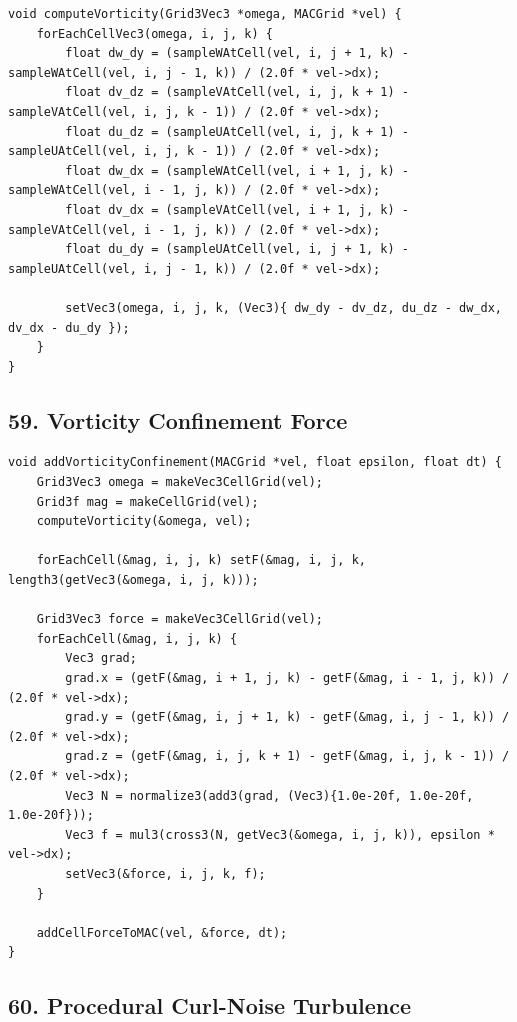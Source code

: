 \documentclass[10pt,letterpaper]{article}
\begin{document}
\begin{verbatim}
void computeVorticity(Grid3Vec3 *omega, MACGrid *vel) {
    forEachCellVec3(omega, i, j, k) {
        float dw_dy = (sampleWAtCell(vel, i, j + 1, k) - sampleWAtCell(vel, i, j - 1, k)) / (2.0f * vel->dx);
        float dv_dz = (sampleVAtCell(vel, i, j, k + 1) - sampleVAtCell(vel, i, j, k - 1)) / (2.0f * vel->dx);
        float du_dz = (sampleUAtCell(vel, i, j, k + 1) - sampleUAtCell(vel, i, j, k - 1)) / (2.0f * vel->dx);
        float dw_dx = (sampleWAtCell(vel, i + 1, j, k) - sampleWAtCell(vel, i - 1, j, k)) / (2.0f * vel->dx);
        float dv_dx = (sampleVAtCell(vel, i + 1, j, k) - sampleVAtCell(vel, i - 1, j, k)) / (2.0f * vel->dx);
        float du_dy = (sampleUAtCell(vel, i, j + 1, k) - sampleUAtCell(vel, i, j - 1, k)) / (2.0f * vel->dx);

        setVec3(omega, i, j, k, (Vec3){ dw_dy - dv_dz, du_dz - dw_dx, dv_dx - du_dy });
    }
}
\end{verbatim}

\subsection*{59. Vorticity Confinement Force}

\begin{verbatim}
void addVorticityConfinement(MACGrid *vel, float epsilon, float dt) {
    Grid3Vec3 omega = makeVec3CellGrid(vel);
    Grid3f mag = makeCellGrid(vel);
    computeVorticity(&omega, vel);

    forEachCell(&mag, i, j, k) setF(&mag, i, j, k, length3(getVec3(&omega, i, j, k)));

    Grid3Vec3 force = makeVec3CellGrid(vel);
    forEachCell(&mag, i, j, k) {
        Vec3 grad;
        grad.x = (getF(&mag, i + 1, j, k) - getF(&mag, i - 1, j, k)) / (2.0f * vel->dx);
        grad.y = (getF(&mag, i, j + 1, k) - getF(&mag, i, j - 1, k)) / (2.0f * vel->dx);
        grad.z = (getF(&mag, i, j, k + 1) - getF(&mag, i, j, k - 1)) / (2.0f * vel->dx);
        Vec3 N = normalize3(add3(grad, (Vec3){1.0e-20f, 1.0e-20f, 1.0e-20f}));
        Vec3 f = mul3(cross3(N, getVec3(&omega, i, j, k)), epsilon * vel->dx);
        setVec3(&force, i, j, k, f);
    }

    addCellForceToMAC(vel, &force, dt);
}
\end{verbatim}

\subsection*{60. Procedural Curl-Noise Turbulence}
\end{document}
